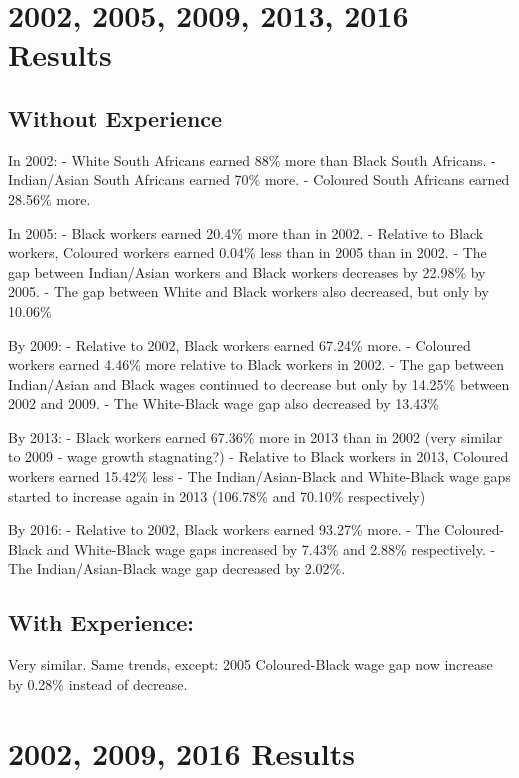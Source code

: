 \documentclass[11pt,preprint, authoryear]{elsarticle}
\numberwithin{equation}{section}
\numberwithin{figure}{section}
\numberwithin{table}{section}
\begin{document}
\hypertarget{results-1}{%
\section{2002, 2005, 2009, 2013, 2016 Results}\label{results-1}}

\hypertarget{without-experience}{%
\subsection{Without Experience}\label{without-experience}}

In 2002: - White South Africans earned 88\% more than Black South
Africans. - Indian/Asian South Africans earned 70\% more. - Coloured
South Africans earned 28.56\% more.

In 2005: - Black workers earned 20.4\% more than in 2002. - Relative to
Black workers, Coloured workers earned 0.04\% less than in 2005 than in
2002. - The gap between Indian/Asian workers and Black workers decreases
by 22.98\% by 2005. - The gap between White and Black workers also
decreased, but only by 10.06\%

By 2009: - Relative to 2002, Black workers earned 67.24\% more. -
Coloured workers earned 4.46\% more relative to Black workers in 2002. -
The gap between Indian/Asian and Black wages continued to decrease but
only by 14.25\% between 2002 and 2009. - The White-Black wage gap also
decreased by 13.43\%

By 2013: - Black workers earned 67.36\% more in 2013 than in 2002 (very
similar to 2009 - wage growth stagnating?) - Relative to Black workers
in 2013, Coloured workers earned 15.42\% less - The Indian/Asian-Black
and White-Black wage gaps started to increase again in 2013 (106.78\%
and 70.10\% respectively)

By 2016: - Relative to 2002, Black workers earned 93.27\% more. - The
Coloured-Black and White-Black wage gaps increased by 7.43\% and 2.88\%
respectively. - The Indian/Asian-Black wage gap decreased by 2.02\%.

\hypertarget{with-experience}{%
\subsection{With Experience:}\label{with-experience}}

Very similar. Same trends, except: 2005 Coloured-Black wage gap now
increase by 0.28\% instead of decrease.

\hypertarget{results-2}{%
\section{2002, 2009, 2016 Results}\label{results-2}}
\end{document}
